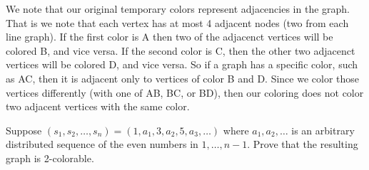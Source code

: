 \documentclass[12pt,twoside]{article} \usepackage{light}
\begin{document}
\begin{problem}{20}
{We note that our original temporary colors represent adjacencies in
the graph. That is we note that each vertex has at most 4 adjacent
nodes (two from each line graph). If the first color is A then two of
the adjacenct vertices will be colored B, and vice versa. If the
second color is C, then the other two adjacenct vertices will be
colored D, and vice versa. So if a graph has a specific color, such as
AC, then it is adjacent only to vertices of color B and D. Since we
color those vertices differently (with one of AB, BC, or BD), then our
coloring does not color two adjacent vertices with the same color.  }

 Suppose $ (s_1,s_2, \ldots ,s_n)= (1,a_1,3,a_2,5,a_3,
\ldots)$ where $a_1, a_2, \ldots$ is an arbitrary distributed sequence
of the even numbers in ${1, \ldots, n-1}$. Prove that the resulting
graph is 2-colorable.

 \eparts
\end{problem}
\end{document}
